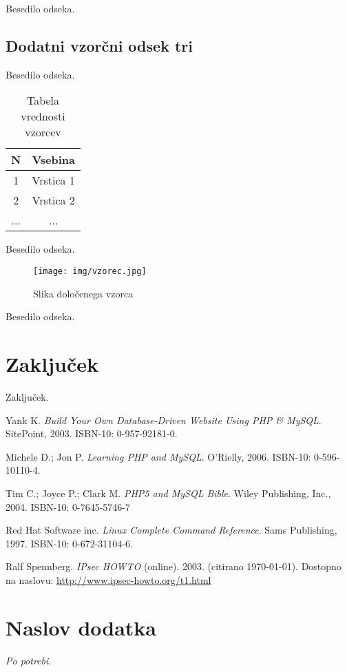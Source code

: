 \documentclass[a4paper,12pt]{report}
\begin{document}
Besedilo odseka.

\section{Dodatni vzorčni odsek tri}

Besedilo odseka.

\begin{table}[htb]
 \centering
 \begin{tabular}{c || c}
  \textbf{N} & Vsebina\\ \hline\hline
  1 & Vrstica 1\\        \hline
  2 & Vrstica 2\\        \hline
  ... & ... \\
\end{tabular}
\caption{Tabela vrednosti vzorcev}
\label{tab:1}
\end{table}

Besedilo odseka.

\begin{figure}[htb]
	\centering
	\texttt{[image: img/vzorec.jpg]}
	\caption{Slika določenega vzorca}
\label{fig:1}
\end{figure}

Besedilo odseka.

\chapter{Zaključek}

Zaključek.

\begin{thebibliography}{99}
\addtocounter{chapter}{1}

 Yank K. \emph{Build Your Own Database-Driven Website Using PHP \& MySQL}. SitePoint, 2003. ISBN-10: 0-957-92181-0.

 Michele D.; Jon P. \emph{Learning PHP and MySQL}. O'Rielly, 2006. ISBN-10: 0-596-10110-4.

 Tim C.; Joyce P.; Clark M. \emph{PHP5 and MySQL Bible}. Wiley Publishing, Inc., 2004. ISBN-10: 0-7645-5746-7

 Red Hat Software inc. \emph{Linux Complete Command Reference}. Sams Publishing, 1997. ISBN-10: 0-672-31104-6.

 Ralf Spennberg. \emph{IPsec HOWTO} (online). 2003. (citirano \today). Dostopno na naslovu:
\url{http://www.ipsec-howto.org/t1.html}

\end{thebibliography}


 \appendix

\chapter{Naslov dodatka}
{\it Po potrebi.}
\end{document}
